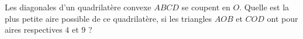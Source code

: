 Les diagonales d'un quadrilatère convexe $ABCD$ se coupent en $O$. Quelle est la plus petite aire possible de ce quadrilatère, si les triangles $AOB$ et $COD$ ont pour aires respectives $4$ et $9$ ?
